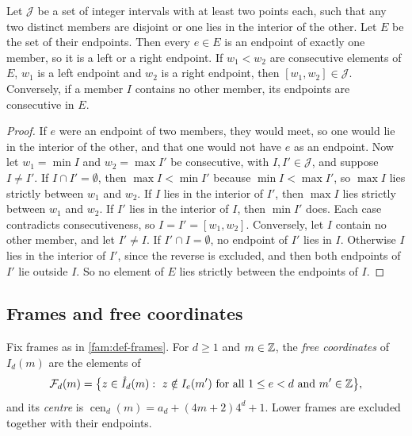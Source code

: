 \begin{lemma}\label{fam:laminar}
Let $\mathcal J$ be a set of integer intervals with at least two points each, such that any two distinct members are disjoint or one lies in the interior of the other. Let $E$ be the set of their endpoints. Then every $e\in E$ is an endpoint of exactly one member, so it is a left or a right endpoint. If $w_1<w_2$ are consecutive elements of $E$, $w_1$ is a left endpoint and $w_2$ is a right endpoint, then $[w_1,w_2]\in\mathcal J$. Conversely, if a member $I$ contains no other member, its endpoints are consecutive in $E$.
\end{lemma}

\begin{proof}
If $e$ were an endpoint of two members, they would meet, so one would lie in the interior of the other, and that one would not have $e$ as an endpoint. Now let $w_1=\min I$ and $w_2=\max I'$ be consecutive, with $I,I'\in\mathcal J$, and suppose $I\ne I'$. If $I\cap I'=\emptyset$, then $\max I<\min I'$ because $\min I<\max I'$, so $\max I$ lies strictly between $w_1$ and $w_2$. If $I$ lies in the interior of $I'$, then $\max I$ lies strictly between $w_1$ and $w_2$. If $I'$ lies in the interior of $I$, then $\min I'$ does. Each case contradicts consecutiveness, so $I=I'=[w_1,w_2]$. Conversely, let $I$ contain no other member, and let $I'\ne I$. If $I'\cap I=\emptyset$, no endpoint of $I'$ lies in $I$. Otherwise $I$ lies in the interior of $I'$, since the reverse is excluded, and then both endpoints of $I'$ lie outside $I$. So no element of $E$ lies strictly between the endpoints of $I$.
\end{proof}

\subsection{Frames and free coordinates}\label{fam:sub-frames}

Fix frames as in \cref{fam:def-frames}. For $d\ge1$ and $m\in\mathbb{Z}$, the \emph{free coordinates} of $I_d(m)$ are the elements of
\[
\mathcal F_d(m)=\bigl\{z\in\mathring I_d(m):\ z\notin I_e(m')\text{ for all }1\le e<d\text{ and }m'\in\mathbb{Z}\bigr\},
\]
and its \emph{centre} is $\operatorname{cen}_d(m)=a_d+(4m+2)4^d+1$. Lower frames are excluded together with their endpoints.

